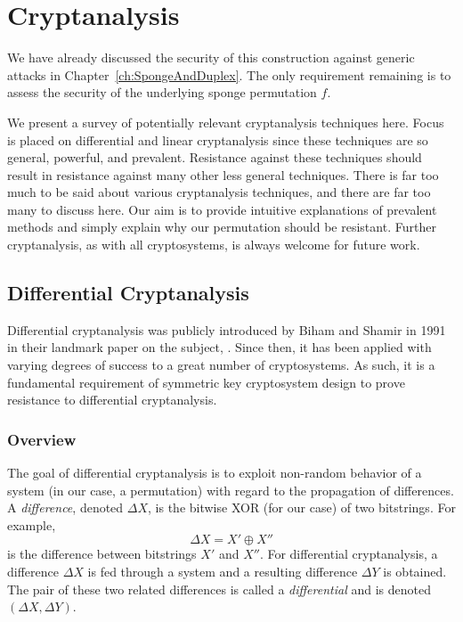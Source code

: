 \chapter{Cryptanalysis}
\label{ch:Cryptanalysis}
We have already discussed the security of this construction against generic attacks in Chapter~\ref{ch:SpongeAndDuplex}.
The only requirement remaining is to assess the security of the underlying sponge permutation $f$.

We present a survey of potentially relevant cryptanalysis techniques here.
Focus is placed on differential and linear cryptanalysis since these techniques are so general, powerful, and prevalent.
Resistance against these techniques should result in resistance against many other less general techniques.
There is far too much to be said about various cryptanalysis techniques, and there are far too many to discuss here.
Our aim is to provide intuitive explanations of prevalent methods and simply explain why our permutation should be resistant.
Further cryptanalysis, as with all cryptosystems, is always welcome for future work.

\section{Differential Cryptanalysis}
Differential cryptanalysis was publicly introduced by Biham and Shamir in 1991 in their landmark paper on the subject, \cite{Biham1991_Differential}.
Since then, it has been applied with varying degrees of success to a great number of cryptosystems.
As such, it is a fundamental requirement of symmetric key cryptosystem design to prove resistance to differential cryptanalysis.

\subsection{Overview}
The goal of differential cryptanalysis is to exploit non-random behavior of a system (in our case, a permutation) with regard to the propagation of differences.
A \emph{difference}, denoted $\Delta X$, is the bitwise XOR (for our case) of two bitstrings. For example,
\begin{equation*}
\Delta X = X' \oplus X''
\end{equation*}
is the difference between bitstrings $X'$ and $X''$.
For differential cryptanalysis, a difference $\Delta X$ is fed through a system and a resulting difference $\Delta Y$ is obtained.
The pair of these two related differences is called a \emph{differential} and is denoted $(\Delta X,\Delta Y)$.

